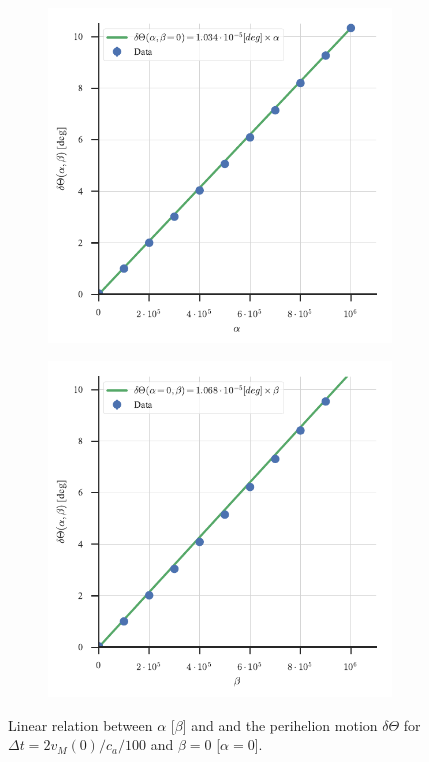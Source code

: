 \documentclass[12pt,ngerman,american]{iopart}
\begin{document}
\begin{figure}[htb]
	\centering
	\begin{subfigure}[c]{0.49\textwidth}
		\includegraphics[width=\textwidth]{figs/alpha-angle.pdf}
		\caption{\label{fig:angle-alpha}}
	\end{subfigure}
	\begin{subfigure}[c]{0.49\textwidth}
		\includegraphics[width=\textwidth]{figs/beta-angle.pdf}
		\caption{\label{fig:beta-alpha}}
	\end{subfigure}
	\caption{\label{fig:AlphaAngle} Linear relation between $\alpha$ [$\beta$] and and the perihelion motion $\delta \Theta$ for $\Delta t=2v_M(0)/c_a/100$ and $\beta=0$ [$\alpha=0$].}
\end{figure}
\end{document}
